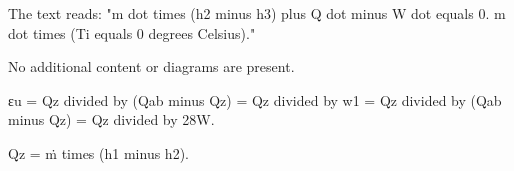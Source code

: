 The text reads:  
"m dot times (h2 minus h3) plus Q dot minus W dot equals 0.  
m dot times (Ti equals 0 degrees Celsius)."  

No additional content or diagrams are present.

εu = Qz divided by (Qab minus Qz) = Qz divided by w1 = Qz divided by (Qab minus Qz) = Qz divided by 28W.  

Qz = ṁ times (h1 minus h2).